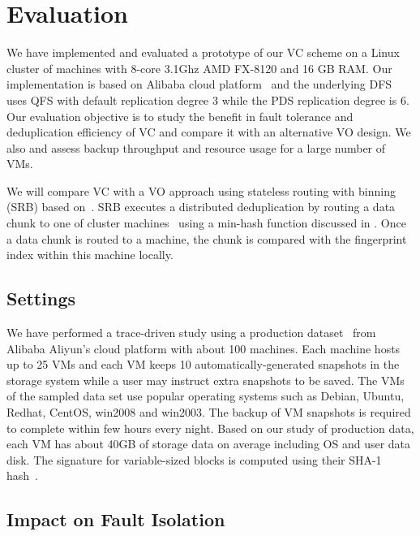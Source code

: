 \section{Evaluation}
\label{sect:evaluation}
We have implemented and evaluated a prototype of our VC scheme on a Linux cluster of machines with
8-core 3.1Ghz AMD FX-8120 and 16 GB RAM. 
Our implementation is based on Alibaba cloud platform~\cite{Aliyun,WeiZhangIEEE}
and the underlying DFS uses  QFS with default replication degree 3 while the PDS replication degree is 6.
Our evaluation objective is to
study the benefit in fault tolerance and   deduplication efficiency of VC and compare it
with an alternative VO design. We also and assess backup throughput and  resource usage for a large number of VMs.

We will compare VC with a VO approach  using stateless routing with binning (SRB) 
based on~\cite{Dong2011,extreme_binning09}.
SRB executes a distributed deduplication by routing a data chunk to one of cluster machines~\cite{Dong2011}
using  a min-hash function discussed in \cite{extreme_binning09}. Once a data chunk is routed to
a machine, the chunk is compared with the fingerprint index within this machine locally. 

\subsection{Settings}
We have performed a trace-driven study using a production dataset~\cite{WeiZhangIEEE} from 
Alibaba Aliyun's cloud platform with about 100 machines. 
Each machine hosts up to 25 VMs and each VM keeps 10 automatically-generated snapshots in the storage system while
a user may instruct extra snapshots to be saved.
The VMs of the sampled data set use popular operating systems such as 
Debian, Ubuntu, Redhat, CentOS, win2008 and win2003. 
The backup of VM snapshots is required to complete within few  hours every night.
Based on our study of production  data,  each VM has about 40GB of storage  data  on average
including OS and user data disk.
The signature for variable-sized blocks is computed using their SHA-1 hash~\cite{similar94,rabin81}. 

\subsection{Impact on Fault Isolation}

